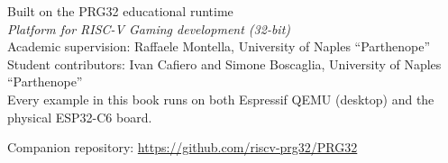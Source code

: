 \begin{titlepage}
\vfill

\begin{flushleft}
{\sffamily\normalsize\color{prgink}
Built on the PRG32 educational runtime\\
\textit{Platform for RISC-V Gaming development (32-bit)}}\\[10pt]
{\small Academic supervision: Raffaele Montella, University of Naples ``Parthenope''\\
Student contributors: Ivan Cafiero and Simone Boscaglia, University of Naples ``Parthenope''\\[10pt]
Every example in this book runs on both Espressif QEMU (desktop) and the physical ESP32-C6 board.}
\end{flushleft}

\vspace{1.2cm}
{\footnotesize\color{prgcomment} Companion repository: \url{https://github.com/riscv-prg32/PRG32}}
\end{titlepage}
